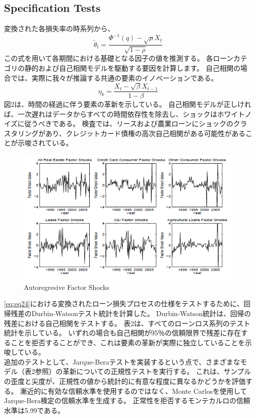 \documentclass[a4j,12pt]{jarticle}
\begin{document}
\subsection{Specification Tests}
変換された各損失率の時系列から、
\begin{equation}
\tilde{\theta}_t=\frac{\Phi^{-1}(q)-\sqrt{\rho}X_t}{\sqrt{1-\rho}}
\end{equation}
この式を用いて各期間における基礎となる因子の値を推測する。 各ローンカテゴリの静的および自己相関モデルを駆動する要因を計算します。 自己相関の場合では、実際に我々が推論する共通の要素のイノベーションである。
\begin{equation}
\eta_k=\frac{X_t-\sqrt{\beta}X_{t-1}}{1-\beta}
\end{equation}
図2は、時間の経過に伴う要素の革新を示している。 自己相関モデルが正しければ、一次遅れはデータからすべての時間依存性を除去し、ショックはホワイトノイズに従うべきである。 検査では、リースおよび農業ローンにショックのクラスタリングがあり、クレジットカード債権の高次自己相関がある可能性があることが示唆されている。
\begin{figure}[H]
\includegraphics{figure/ch2.png}
\caption{Autoregresive Factor Shocks}
\end{figure}
\eqref{eq:eq24}における変換されたローン損失プロセスの仕様をテストするために、回帰残差のDurbin-Watsonテスト統計を計算した。 Durbin-Watson統計は、回帰の残差における自己相関をテストする。 表2は、すべてのローンロス系列のテスト統計を示している。 いずれの場合も自己相関が95％の信頼限界で残差に存在することを拒否することができ、これは要素の革新が実際に独立していることを示唆している。\\
追加のテストとして、Jarque-Beraテストを実装するという点で、さまざまなモデル（表2参照）の革新についての正規性テストを実行する。 これは、サンプルの歪度と尖度が、正規性の値から統計的に有意な程度に異なるかどうかを評価する。 漸近的に有効な信頼水準を使用するのではなく、Monte Carlosを使用してJarque-Bera検定の信頼水準を生成する。 正常性を拒否するモンテカルロの信頼水準は5.99である。\\
\end{document}
